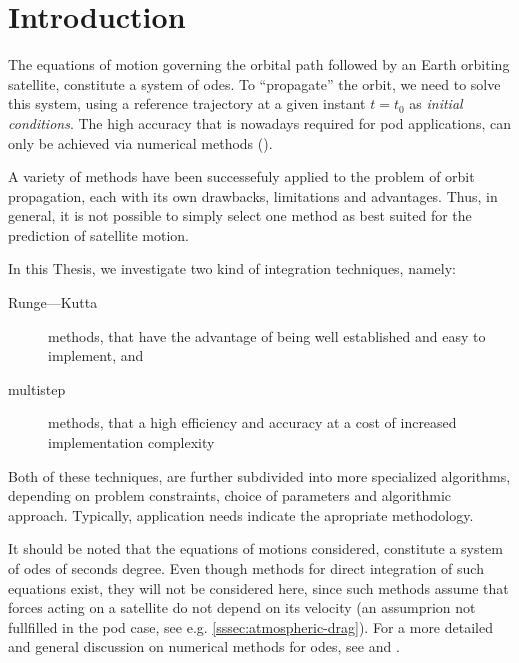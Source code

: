 \section{Introduction}\label{sec:integration-introduction}

The equations of motion governing the orbital path followed by an Earth orbiting 
satellite, constitute a system of \glspl{ode}. To ``propagate'' the orbit, we need 
to solve this system, using a reference trajectory at a given instant $t=t_0$ as 
\emph{initial conditions}. The high accuracy that is nowadays required for \gls{pod} 
applications, can only be achieved via numerical methods (\cite{Montenbruck2000}).

A variety of methods have been successefuly applied to the problem of orbit 
propagation, each with its own drawbacks, limitations and advantages. Thus, in 
general, it is not possible to simply select one method as best suited for the 
prediction of satellite motion.

In this Thesis, we investigate two kind of integration techniques, namely:
\begin{description}
    \item[Runge—Kutta] methods, that have the advantage of being well established 
      and easy to implement, and
    \item[multistep] methods, that a high efficiency and accuracy at a cost of 
      increased implementation complexity
\end{description}
Both of these techniques, are further subdivided into more specialized algorithms, 
depending on problem constraints, choice of parameters and algorithmic approach. 
Typically, application needs indicate the apropriate methodology.

It should be noted that the equations of motions considered, constitute a system 
of \glspl{ode} of seconds degree. Even though methods for direct integration of 
such equations exist, they will not be considered here, since such methods assume 
that forces acting on a satellite do not depend on its velocity (an assumprion not 
fullfilled in the \gls{pod} case, see e.g. \autoref{sssec:atmospheric-drag}).
For a more detailed and general discussion on numerical methods for \glspl{ode}, 
see \cite{Hairer2009I} and \cite{Hairer2010II}.

